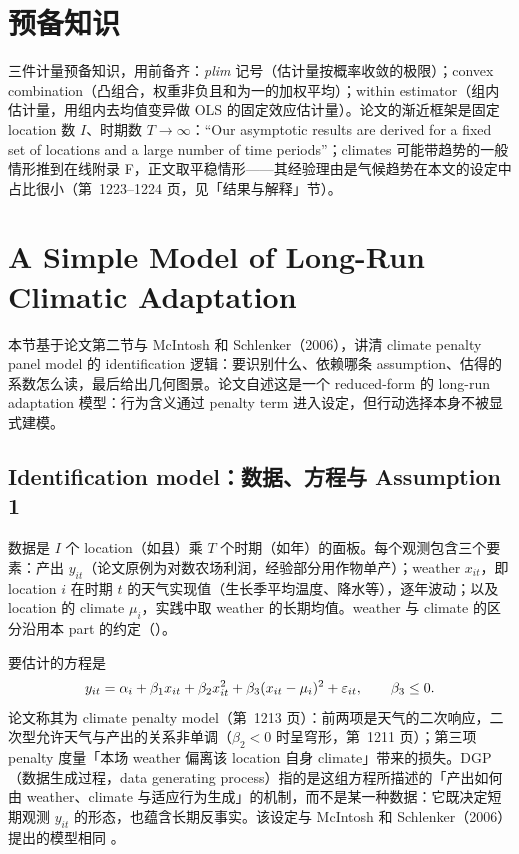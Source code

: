 \section{预备知识}

三件计量预备知识，用前备齐：\emph{plim} 记号（估计量按概率收敛的极限）；convex combination（凸组合，权重非负且和为一的加权平均）；within estimator（组内估计量，用组内去均值变异做 OLS 的固定效应估计量）。论文的渐近框架是固定 location 数 $I$、时期数 $T\to\infty$：``Our asymptotic results are derived for a fixed set of locations and a large number of time periods''\citep[第~1214 页]{merel2021climate}；climates 可能带趋势的一般情形推到在线附录 F，正文取平稳情形——其经验理由是气候趋势在本文的设定中占比很小（第~1223--1224 页，见「结果与解释」节）。
\section{A Simple Model of Long-Run Climatic Adaptation}
\label{sec:cca-model}
本节基于论文第二节与 McIntosh 和 Schlenker（2006），讲清 climate penalty panel model 的 identification 逻辑：要识别什么、依赖哪条 assumption、估得的系数怎么读，最后给出几何图景。论文自述这是一个 reduced-form 的 long-run adaptation 模型：行为含义通过 penalty term 进入设定，但行动选择本身不被显式建模。

\subsection{Identification model：数据、方程与 Assumption 1}

数据是 $I$ 个 location（如县）乘 $T$ 个时期（如年）的面板。每个观测包含三个要素：产出 $y_{it}$（论文原例为对数农场利润，经验部分用作物单产）；weather $x_{it}$，即 location $i$ 在时期 $t$ 的天气实现值（生长季平均温度、降水等），逐年波动；以及 location 的 climate $\mu_i$，实践中取 weather 的长期均值。weather 与 climate 的区分沿用本 part 的约定（）。

要估计的方程是
\begin{equation}
y_{it} = \alpha_i + \beta_1 x_{it} + \beta_2 x_{it}^2 + \beta_3 (x_{it}-\mu_i)^2 + \varepsilon_{it},
\qquad \beta_3 \le 0 .
\label{eq:cca-dgp}
\end{equation}
论文称其为 climate penalty model（第~1213 页）：前两项是天气的二次响应，二次型允许天气与产出的关系非单调（$\beta_2<0$ 时呈穹形，第~1211 页）；第三项 penalty 度量「本场 weather 偏离该 location 自身 climate」带来的损失。DGP（数据生成过程，data generating process）指的是这组方程所描述的「产出如何由 weather、climate 与适应行为生成」的机制，而不是某一种数据：它既决定短期观测 $y_{it}$ 的形态，也蕴含长期反事实。该设定与 McIntosh 和 Schlenker（2006）提出的模型相同 \citep{mcintosh2006identifying}。

